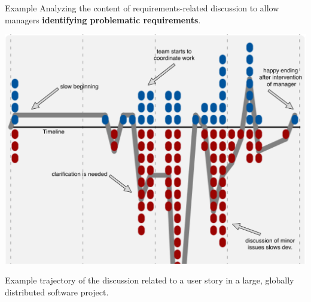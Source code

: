 \documentclass[final]{beamer} %
\newcommand{\marker}[1]{\textbf{\color{knaccentcolor1} #1}}
\begin{document}
\begin{frame}{}
\begin{columns}[t]
\begin{column}{.45\linewidth}
    

    \begin{block}{Example}
    Analyzing the content of requirements-related discussion to allow managers \marker{identifying problematic requirements}.
\begin{center}
\includegraphics[viewport=0 0 625 475,clip=true,width=0.95\linewidth]{img/bike-shed-example}\\
\end{center}


Example trajectory of the discussion related to a user story in a large, globally distributed software project. 
    \end{block}
   


\end{column}
\end{columns}
\end{frame}
\end{document}
